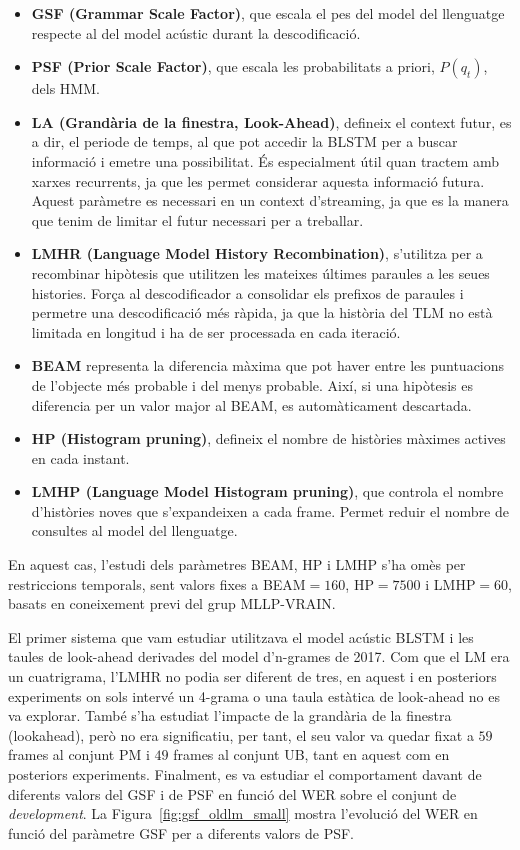 \begin{itemize}
    \item \textbf{GSF (Grammar Scale Factor)}, que escala el pes del model del llenguatge respecte al del model acústic durant la descodificació. 
    \item \textbf{PSF (Prior Scale Factor)}, que escala les probabilitats a priori, $P(q_t)$, dels HMM. 
    \item \textbf{LA (Grandària de la finestra, Look-Ahead)}, defineix el context futur, es a dir, el periode de temps, al que pot accedir la BLSTM per a buscar informació i emetre una possibilitat. És especialment útil quan tractem amb xarxes recurrents, ja que les permet considerar aquesta informació futura. Aquest paràmetre es necessari en un context d'streaming, ja que es la manera que tenim de limitar el futur necessari per a treballar.
    \item \textbf{LMHR (Language Model History Recombination)}, s'utilitza per a recombinar hipòtesis que utilitzen les mateixes últimes paraules a les seues histories. Força al descodificador a consolidar els prefixos de paraules i permetre una descodificació més ràpida, ja que la història del TLM no està limitada en longitud i ha de ser processada en cada iteració.
    \item \textbf{BEAM} representa la diferencia màxima que pot haver entre les puntuacions de l'objecte més probable i del menys probable. Així, si una hipòtesis es diferencia per un valor major al BEAM, es automàticament descartada. 
    \item \textbf{HP (Histogram pruning)}, defineix el nombre de històries màximes actives en cada instant.
    \item \textbf{LMHP (Language Model Histogram pruning)}, que controla el nombre d'històries noves que s'expandeixen a cada frame. Permet reduir el nombre de consultes al model del llenguatge.
\end{itemize}
En aquest cas, l'estudi dels paràmetres BEAM, HP i LMHP s'ha omès per restriccions temporals, sent valors fixes a BEAM$=160$, HP$=7500$ i LMHP$=60$, basats en coneixement previ del grup MLLP-VRAIN.

El primer sistema que vam estudiar utilitzava el model acústic BLSTM i les taules de look-ahead derivades del model d'n-grames de 2017.
Com que el LM era un cuatrigrama, l'LMHR no podia ser diferent de tres, en aquest i en posteriors experiments on sols intervé un 4-grama o una taula estàtica de look-ahead no es va explorar.
També s'ha estudiat l'impacte de la grandària de la finestra (lookahead), però no era significatiu, per tant, el seu valor va quedar fixat a $59$ frames al conjunt PM i $49$ frames al conjunt UB, tant en aquest com en posteriors experiments.
Finalment, es va estudiar el comportament davant de diferents valors del GSF i de PSF en funció del WER sobre el conjunt de \textit{development}. 
La Figura~\ref{fig:gsf_oldlm_small} mostra l'evolució del WER en funció del paràmetre GSF per a diferents valors de PSF.

